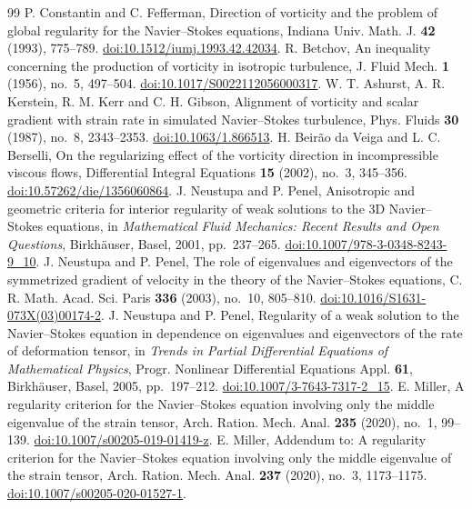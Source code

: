 \documentclass[11pt,a4paper]{article}
\begin{document}
\begin{thebibliography}{99}
 P. Constantin and C. Fefferman, Direction of vorticity and the problem of global regularity for the Navier--Stokes equations, Indiana Univ. Math. J. \textbf{42} (1993), 775--789. \href{https://doi.org/10.1512/iumj.1993.42.42034}{doi:10.1512/iumj.1993.42.42034}.
 R. Betchov, An inequality concerning the production of vorticity in isotropic turbulence, J. Fluid Mech. \textbf{1} (1956), no.~5, 497--504. \href{https://doi.org/10.1017/S0022112056000317}{doi:10.1017/S0022112056000317}.
 W. T. Ashurst, A. R. Kerstein, R. M. Kerr and C. H. Gibson, Alignment of vorticity and scalar gradient with strain rate in simulated Navier--Stokes turbulence, Phys. Fluids \textbf{30} (1987), no.~8, 2343--2353. \href{https://doi.org/10.1063/1.866513}{doi:10.1063/1.866513}.
 H. Beir\~ao da Veiga and L. C. Berselli, On the regularizing effect of the vorticity direction in incompressible viscous flows, Differential Integral Equations \textbf{15} (2002), no.~3, 345--356. \href{https://doi.org/10.57262/die/1356060864}{doi:10.57262/die/1356060864}.
 J. Neustupa and P. Penel, Anisotropic and geometric criteria for interior regularity of weak solutions to the 3D Navier--Stokes equations, in \emph{Mathematical Fluid Mechanics: Recent Results and Open Questions}, Birkh\"auser, Basel, 2001, pp.~237--265. \href{https://doi.org/10.1007/978-3-0348-8243-9_10}{doi:10.1007/978-3-0348-8243-9\_10}.
 J. Neustupa and P. Penel, The role of eigenvalues and eigenvectors of the symmetrized gradient of velocity in the theory of the Navier--Stokes equations, C. R. Math. Acad. Sci. Paris \textbf{336} (2003), no.~10, 805--810. \href{https://doi.org/10.1016/S1631-073X(03)00174-2}{doi:10.1016/S1631-073X(03)00174-2}.
 J. Neustupa and P. Penel, Regularity of a weak solution to the Navier--Stokes equation in dependence on eigenvalues and eigenvectors of the rate of deformation tensor, in \emph{Trends in Partial Differential Equations of Mathematical Physics}, Progr. Nonlinear Differential Equations Appl. \textbf{61}, Birkh\"auser, Basel, 2005, pp.~197--212. \href{https://doi.org/10.1007/3-7643-7317-2_15}{doi:10.1007/3-7643-7317-2\_15}.
 E. Miller, A regularity criterion for the Navier--Stokes equation involving only the middle eigenvalue of the strain tensor, Arch. Ration. Mech. Anal. \textbf{235} (2020), no.~1, 99--139. \href{https://doi.org/10.1007/s00205-019-01419-z}{doi:10.1007/s00205-019-01419-z}.
 E. Miller, Addendum to: A regularity criterion for the Navier--Stokes equation involving only the middle eigenvalue of the strain tensor, Arch. Ration. Mech. Anal. \textbf{237} (2020), no.~3, 1173--1175. \href{https://doi.org/10.1007/s00205-020-01527-1}{doi:10.1007/s00205-020-01527-1}.
\end{thebibliography}
\end{document}

